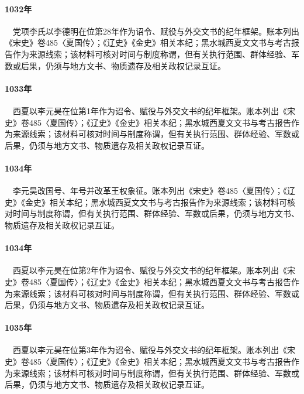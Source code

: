 \paragraph{1032年}　党项李氏以李德明在位第28年作为诏令、赋役与外交文书的纪年框架。账本列出《宋史》卷485〈夏国传〉；《辽史》《金史》相关本纪；黑水城西夏文文书与考古报告作为来源线索；该材料可核对时间与制度称谓，但有关执行范围、群体经验、军数或后果，仍须与地方文书、物质遗存及相关政权记录互证。

\paragraph{1033年}　西夏以李元昊在位第1年作为诏令、赋役与外交文书的纪年框架。账本列出《宋史》卷485〈夏国传〉；《辽史》《金史》相关本纪；黑水城西夏文文书与考古报告作为来源线索；该材料可核对时间与制度称谓，但有关执行范围、群体经验、军数或后果，仍须与地方文书、物质遗存及相关政权记录互证。

\paragraph{1034年}　李元昊改国号、年号并改革王权象征。账本列出《宋史》卷485〈夏国传〉；《辽史》《金史》相关本纪；黑水城西夏文文书与考古报告作为来源线索；该材料可核对时间与制度称谓，但有关执行范围、群体经验、军数或后果，仍须与地方文书、物质遗存及相关政权记录互证。

\paragraph{1034年}　西夏以李元昊在位第2年作为诏令、赋役与外交文书的纪年框架。账本列出《宋史》卷485〈夏国传〉；《辽史》《金史》相关本纪；黑水城西夏文文书与考古报告作为来源线索；该材料可核对时间与制度称谓，但有关执行范围、群体经验、军数或后果，仍须与地方文书、物质遗存及相关政权记录互证。

\paragraph{1035年}　西夏以李元昊在位第3年作为诏令、赋役与外交文书的纪年框架。账本列出《宋史》卷485〈夏国传〉；《辽史》《金史》相关本纪；黑水城西夏文文书与考古报告作为来源线索；该材料可核对时间与制度称谓，但有关执行范围、群体经验、军数或后果，仍须与地方文书、物质遗存及相关政权记录互证。

